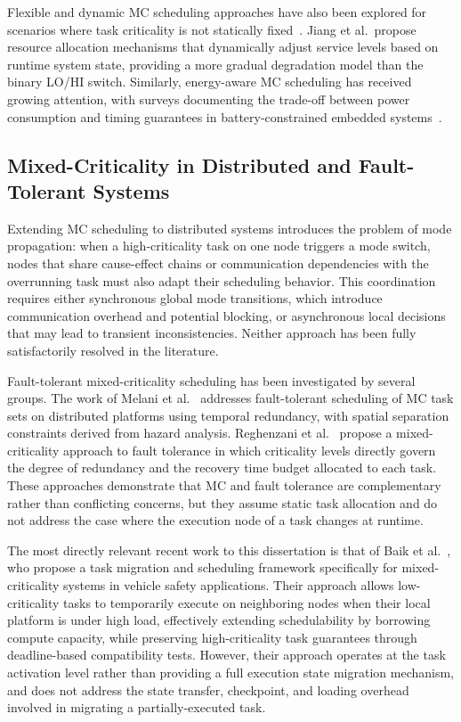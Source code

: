 Flexible and dynamic MC scheduling approaches have also been explored for scenarios
where task criticality is not statically fixed~\cite{jiang2022flexible}. Jiang et
al.\ propose resource allocation mechanisms that dynamically adjust service levels
based on runtime system state, providing a more gradual degradation model than the
binary LO/HI switch. Similarly, energy-aware MC scheduling has received growing
attention, with surveys documenting the trade-off between power consumption and
timing guarantees in battery-constrained embedded systems~\cite{mcsEnergySurvey2022}.

\subsection{Mixed-Criticality in Distributed and Fault-Tolerant Systems}
\label{subsec:rw_mc_distributed}

Extending MC scheduling to distributed systems introduces the problem of mode
propagation: when a high-criticality task on one node triggers a mode switch, nodes
that share cause-effect chains or communication dependencies with the overrunning
task must also adapt their scheduling behavior. This coordination requires either
synchronous global mode transitions, which introduce communication overhead and
potential blocking, or asynchronous local decisions that may lead to transient
inconsistencies. Neither approach has been fully satisfactorily resolved in the
literature.

Fault-tolerant mixed-criticality scheduling has been investigated by several groups.
The work of Melani et al.~\cite{melani2017} addresses fault-tolerant scheduling of
MC task sets on distributed platforms using temporal redundancy, with spatial
separation constraints derived from hazard analysis. Reghenzani et al.~\cite{reghenzani2022}
propose a mixed-criticality approach to fault tolerance in which criticality levels
directly govern the degree of redundancy and the recovery time budget allocated to
each task. These approaches demonstrate that MC and fault tolerance are complementary
rather than conflicting concerns, but they assume static task allocation and do not
address the case where the execution node of a task changes at runtime.

The most directly relevant recent work to this dissertation is that of Baik et
al.~\cite{baik2022}, who propose a task migration and scheduling framework
specifically for mixed-criticality systems in vehicle safety applications. Their
approach allows low-criticality tasks to temporarily execute on neighboring nodes
when their local platform is under high load, effectively extending schedulability
by borrowing compute capacity, while preserving high-criticality task guarantees
through deadline-based compatibility tests. However, their approach operates at the
task activation level rather than providing a full execution state migration
mechanism, and does not address the state transfer, checkpoint, and loading
overhead involved in migrating a partially-executed task.


